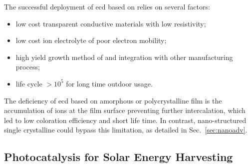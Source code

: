 The successful deployment of \gls{ecd} based on  relies on several factors:\cite{Granqvist2000}
\begin{itemize}
\item low cost transparent conductive materials with low resistivity;
\item low cost ion electrolyte of poor electron mobility;
\item high yield growth method of  and integration with other manufacturing process; 
\item life cycle $> 10^5$ for long time outdoor usage.
\end{itemize}
The deficiency of \gls{ecd} based on amorphous or polycrystalline  film is the accumulation of ions at the film surface preventing further intercalation,\cite{Dini1996} which led to low coloration efficiency and short life time. In contrast, nano-structured single crystalline  could bypass this limitation, as detailed in Sec.~\ref{sec:nanoadv}.

\subsection{Photocatalysis for Solar Energy Harvesting}

